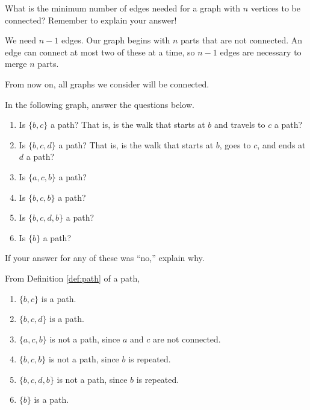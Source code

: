 \documentclass[11pt]{article}
\begin{document}
\begin{problem} %
What is the minimum number of edges needed for a graph with $n$ vertices to be connected? Remember to explain your answer!
\end{problem}

\begin{solution}
We need $\boxed{n-1}$ edges. Our graph begins with $n$ parts that are not connected. An edge can connect at most two of these at a time, so
$n-1$ edges are necessary to merge $n$ parts.
\end{solution}

From now on, all graphs we consider will be connected.

\begin{problem} %
In the following graph, answer the questions below.
\begin{center}
\end{center}
\begin{enumerate}[label=(\alph*)]
\item Is $\{b,c\}$ a path? That is, is the walk that starts at $b$ and travels to $c$ a path?
\item Is $\{b,c,d\}$ a path? That is, is the walk that starts at $b$, goes to $c$, and ends at $d$ a path?
\item Is $\{a,c,b\}$ a path?
\item Is $\{b,c,b\}$ a path?
\item Is $\{b,c,d,b\}$ a path?
\item Is $\{b\}$ a path?
\end{enumerate}
If your answer for any of these was ``no,'' explain why.
\end{problem}

\begin{solution}
From Definition \ref{def:path} of a path,
\begin{enumerate}[label=(\alph*)]
\item $\{b,c\}$ is a path.
\item $\{b,c,d\}$ is a path.
\item $\{a,c,b\}$ is not a path, since $a$ and $c$ are not connected.
\item $\{b,c,b\}$ is not a path, since $b$ is repeated.
\item $\{b,c,d,b\}$ is not a path, since $b$ is repeated.
\item $\{b\}$ is a path.
\end{enumerate}
\end{solution}
\end{document}
